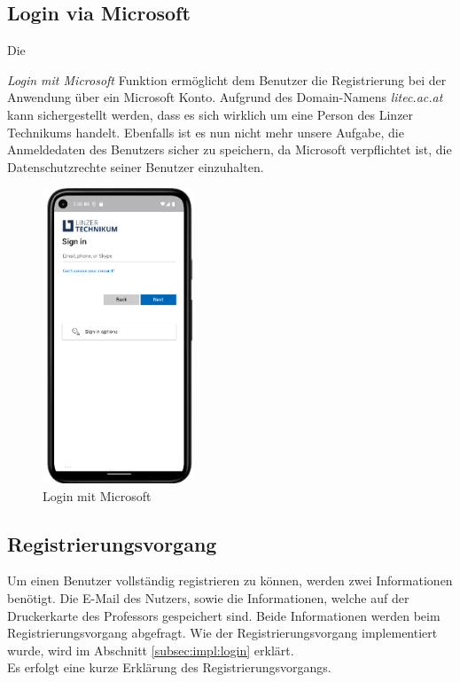 \subsection{Login via Microsoft}
Die {\textit{Login mit Microsoft} Funktion ermöglicht dem Benutzer die Registrierung bei der Anwendung über ein Microsoft Konto. Aufgrund des Domain-Namens {\textit{litec.ac.at}} kann sichergestellt werden, dass es sich wirklich um eine Person des Linzer Technikums handelt. Ebenfalls ist es nun nicht mehr unsere Aufgabe, die Anmeldedaten des Benutzers sicher zu speichern, da Microsoft verpflichtet ist, die Datenschutzrechte seiner Benutzer einzuhalten.

\begin{figure}[!h]
\centering
\includegraphics[width=0.4\textwidth]{FLUTTER/images/GP/Login_Micro.png}
\caption{Login mit Microsoft}
\end{figure}

\newpage

\subsection{Registrierungsvorgang}\label{subsec:Registrierungsvorgang}
Um einen Benutzer vollständig registrieren zu können, werden zwei Informationen benötigt. Die E-Mail des Nutzers, sowie die Informationen, welche auf der Druckerkarte des Professors gespeichert sind. Beide Informationen werden beim Registrierungsvorgang abgefragt. Wie der Registrierungsvorgang implementiert wurde, wird im Abschnitt  \ref{subsec:impl:login}  erklärt.
\\Es erfolgt eine kurze Erklärung des Registrierungsvorgangs.

}
